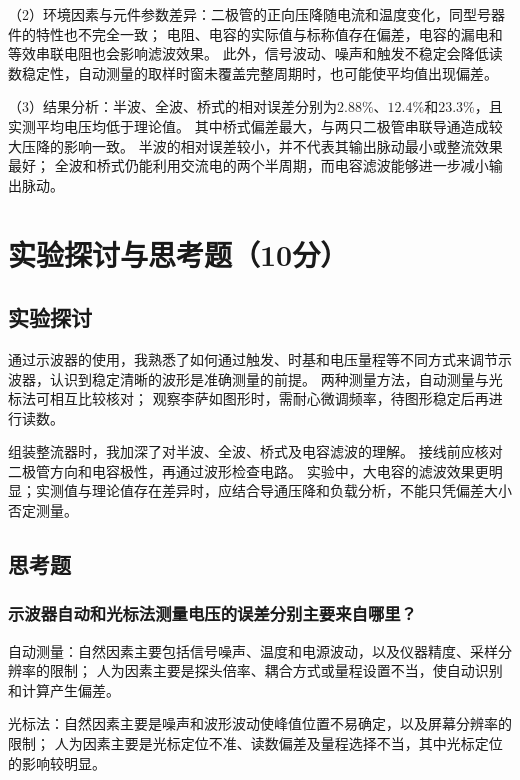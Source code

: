 \documentclass[10pt,a4paper]{ctexart} %
\begin{document}
    （2）环境因素与元件参数差异：二极管的正向压降随电流和温度变化，同型号器件的特性也不完全一致；
    电阻、电容的实际值与标称值存在偏差，电容的漏电和等效串联电阻也会影响滤波效果。
    此外，信号波动、噪声和触发不稳定会降低读数稳定性，自动测量的取样时窗未覆盖完整周期时，也可能使平均值出现偏差。

    （3）结果分析：半波、全波、桥式的相对误差分别为$2.88\%$、$12.4\%$和$23.3\%$，且实测平均电压均低于理论值。
    其中桥式偏差最大，与两只二极管串联导通造成较大压降的影响一致。
    半波的相对误差较小，并不代表其输出脉动最小或整流效果最好；
    全波和桥式仍能利用交流电的两个半周期，而电容滤波能够进一步减小输出脉动。

\section{实验探讨与思考题（10分）}

  \subsection{实验探讨}

    通过示波器的使用，我熟悉了如何通过触发、时基和电压量程等不同方式来调节示波器，认识到稳定清晰的波形是准确测量的前提。
    两种测量方法，自动测量与光标法可相互比较核对；
    观察李萨如图形时，需耐心微调频率，待图形稳定后再进行读数。

    组装整流器时，我加深了对半波、全波、桥式及电容滤波的理解。
    接线前应核对二极管方向和电容极性，再通过波形检查电路。
    实验中，大电容的滤波效果更明显；实测值与理论值存在差异时，应结合导通压降和负载分析，不能只凭偏差大小否定测量。

  \subsection{思考题}

    \subsubsection{示波器自动和光标法测量电压的误差分别主要来自哪里？}

    自动测量：自然因素主要包括信号噪声、温度和电源波动，以及仪器精度、采样分辨率的限制；
    人为因素主要是探头倍率、耦合方式或量程设置不当，使自动识别和计算产生偏差。

    光标法：自然因素主要是噪声和波形波动使峰值位置不易确定，以及屏幕分辨率的限制；
    人为因素主要是光标定位不准、读数偏差及量程选择不当，其中光标定位的影响较明显。
\end{document}
